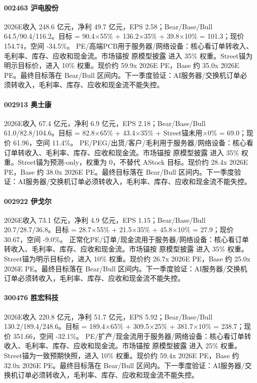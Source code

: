 \paragraph{002463 沪电股份} 2026E收入 248.6 亿元，净利 49.7 亿元，EPS 2.58；Bear/Base/Bull 64.5/90.4/116.2。目标 = 90.4×55\% + 136.2×35\% + 39.8×10\% = 101.3；现价 154.74，空间 -34.5\%。 PE/高端PCB用于服务器/网络设备：核心看订单转收入、毛利率、库存、应收和现金流。市场锚按 原模型披露 进入 35\% 权重。Street锚为明示目标价，进入 10\% 权重。现价约 59.9x 2026E PE，Base 约 35.0x 2026E PE。最终目标落在 Bear/Bull 区间内。下一季度验证：AI服务器/交换机订单必须转收入，毛利率、库存、应收和现金流不能失控。
\paragraph{002913 奥士康} 2026E收入 67.4 亿元，净利 6.9 亿元，EPS 2.18；Bear/Base/Bull 61.0/82.8/104.6。目标 = 82.8×65\% + 43.4×35\% + Street锚未用×0\% = 69.0；现价 61.96，空间 11.4\%。 PE/PEG/出货/客户/毛利用于服务器/网络设备：核心看订单转收入、毛利率、库存、应收和现金流。市场锚按 原模型披露 进入 35\% 权重。Street锚为预测-only，权重为 0，不替代 AStock 目标。现价约 28.4x 2026E PE，Base 约 38.0x 2026E PE。最终目标落在 Bear/Bull 区间内。下一季度验证：AI服务器/交换机订单必须转收入，毛利率、库存、应收和现金流不能失控。
\paragraph{002922 伊戈尔} 2026E收入 73.1 亿元，净利 4.9 亿元，EPS 1.15；Bear/Base/Bull 20.7/28.7/36.8。目标 = 28.7×55\% + 21.5×35\% + 45.8×10\% = 27.9；现价 30.67，空间 -9.0\%。 正常化PE/订单/现金流用于服务器/网络设备：核心看订单转收入、毛利率、库存、应收和现金流。市场锚按 原模型披露 进入 35\% 权重。Street锚为明示目标价，进入 10\% 权重。现价约 26.7x 2026E PE，Base 约 25.0x 2026E PE。最终目标落在 Bear/Bull 区间内。下一季度验证：AI服务器/交换机订单必须转收入，毛利率、库存、应收和现金流不能失控。
\paragraph{300476 胜宏科技} 2026E收入 220.8 亿元，净利 51.7 亿元，EPS 5.92；Bear/Base/Bull 130.2/189.4/248.6。目标 = 189.4×65\% + 309.5×25\% + 381.7×10\% = 238.7；现价 351.66，空间 -32.1\%。 PE/扩产/现金流用于服务器/网络设备：核心看订单转收入、毛利率、库存、应收和现金流。市场锚按 原模型披露 进入 25\% 权重。Street锚为一致预期快照，进入 10\% 权重。现价约 59.4x 2026E PE，Base 约 32.0x 2026E PE。最终目标落在 Bear/Bull 区间内。下一季度验证：AI服务器/交换机订单必须转收入，毛利率、库存、应收和现金流不能失控。
